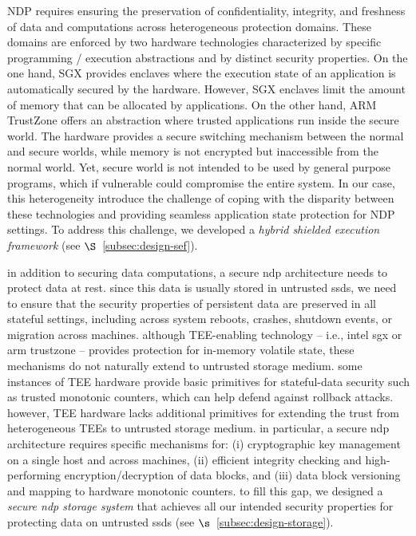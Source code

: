  NDP requires ensuring the preservation of confidentiality, integrity, and freshness of data and computations across heterogeneous protection domains. These domains are enforced by two hardware technologies characterized by specific programming / execution abstractions and by distinct security properties. On the one hand, SGX provides enclaves where the execution state of an application is automatically secured by the hardware. However, SGX enclaves limit the amount of memory that can be allocated by applications.
On the other hand, ARM TrustZone offers an abstraction where trusted applications run inside the secure world. The hardware provides a secure switching mechanism between the normal and secure worlds, %
while memory is not encrypted but inaccessible from the normal world.
Yet, secure world is not intended to be used by general purpose programs, which if vulnerable could compromise the entire system.
In our case, this heterogeneity introduce the challenge of coping with the disparity between these technologies and providing seamless application state protection for NDP settings. To address this challenge, we developed a \textit{hybrid shielded execution framework} (see $\S$~\ref{subsec:design-sef}).

 in addition to securing data computations, a secure ndp architecture needs to protect data at rest. since this data is usually stored in untrusted ssds, we need to ensure that the security properties of persistent data are preserved in all stateful settings, including across system reboots, crashes, shutdown events, or migration across machines. although TEE-enabling technology -- i.e., intel sgx or arm trustzone -- provides protection for in-memory volatile state, these mechanisms do not naturally extend to untrusted storage medium. some instances of TEE hardware provide basic primitives for stateful-data security such as trusted monotonic counters, which can help defend against rollback attacks. however, TEE hardware lacks additional primitives for extending the trust from heterogeneous TEEs to untrusted storage medium. in particular, a secure ndp architecture requires specific mechanisms for: (i) cryptographic key management on a single host and across machines, (ii) efficient integrity checking and high-performing encryption/decryption of data blocks, and (iii) data block versioning and mapping to hardware monotonic counters. to fill this gap, we designed a \textit{secure ndp storage system} that achieves all our intended security properties for protecting data on untrusted ssds (see $\s$~\ref{subsec:design-storage}).
\fi


